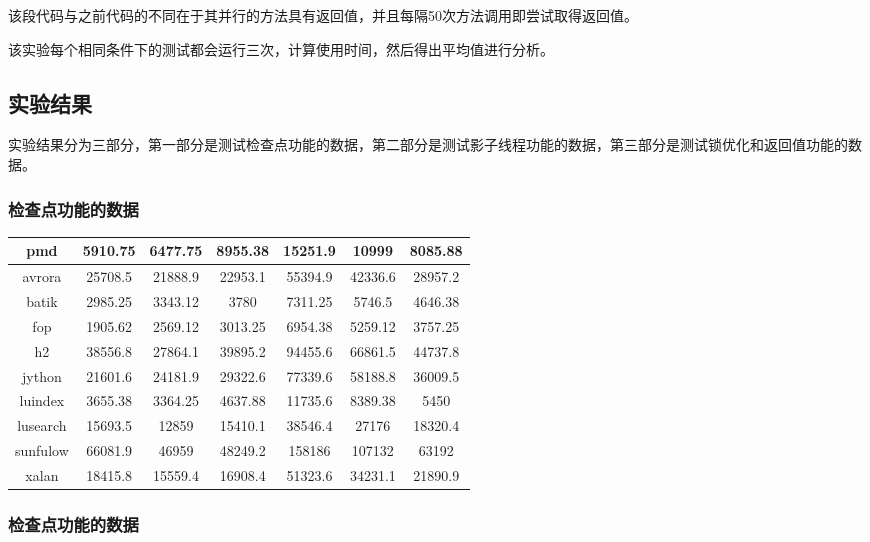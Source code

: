 该段代码与之前代码的不同在于其并行的方法具有返回值，并且每隔50次方法调用即尝试取得返回值。

该实验每个相同条件下的测试都会运行三次，计算使用时间，然后得出平均值进行分析。

\subsection{实验结果}

实验结果分为三部分，第一部分是测试检查点功能的数据，第二部分是测试影子线程功能的数据，第三部分是测试锁优化和返回值功能的数据。

\subsubsection{检查点功能的数据}

\begin{table}[htbp]
	\centering
	\begin{tabular}{c|c|c|c|c|c|c}
		\hline
		pmd & 5910.75 & 6477.75 & 8955.38 & 15251.9 & 10999 & 8085.88 \\
		\hline
		avrora & 25708.5 & 21888.9 & 22953.1 & 55394.9 & 42336.6 & 28957.2 \\
		\hline
		batik & 2985.25 & 3343.12 & 3780 & 7311.25 & 5746.5 & 4646.38 \\
		\hline
		fop & 1905.62 & 2569.12 & 3013.25 & 6954.38 & 5259.12 & 3757.25 \\
		\hline
		h2 & 38556.8 & 27864.1 & 39895.2 & 94455.6 & 66861.5 & 44737.8 \\
		\hline
		jython & 21601.6 & 24181.9 & 29322.6 & 77339.6 & 58188.8 & 36009.5 \\
		\hline
		luindex & 3655.38 & 3364.25 & 4637.88 & 11735.6 & 8389.38 & 5450 \\
		\hline
		lusearch & 15693.5 & 12859 & 15410.1 & 38546.4 & 27176 & 18320.4 \\
		\hline
		sunfulow & 66081.9 & 46959 & 48249.2 & 158186 & 107132 & 63192 \\
		\hline
		xalan & 18415.8 & 15559.4 & 16908.4 & 51323.6 & 34231.1 & 21890.9 \\
		\hline
	\end{tabular}
\end{table}

\subsubsection{检查点功能的数据}

